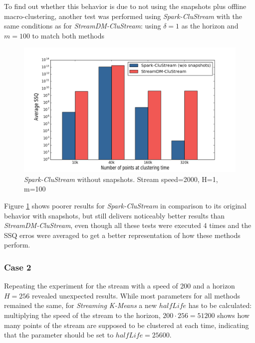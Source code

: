 \documentclass[10pt, conference, compsocconf]{IEEEtran}
\begin{document}
To find out whether this behavior is due to not using the snapshots plus offline macro-clustering, another test was performed using \textit{Spark-CluStream} with the same conditions as for \textit{StreamDM-CluStream}: using $\delta = 1$ as the horizon and $m=100$ to match both methods

\begin{figure}[h]
 \centering
 \includegraphics[scale=0.35]{./styles/comparisonNoSnaps.png}
 \caption{\textit{Spark-CluStream} without snapshots. Stream speed=2000, H=1, m=100}
 \label{fig:comparisonNoSnaps}
\end{figure}

Figure \ref{fig:comparisonNoSnaps} shows poorer results for \textit{Spark-CluStream} in comparison to its original behavior with snapshots, but still delivers noticeably better results than \textit{StreamDM-CluStream}, even though all these tests were executed 4 times and the SSQ erros were averaged to get a better representation of how these methods perform.

\subsubsection{Case 2}

Repeating the experiment for the stream with a speed of 200 and a horizon $H=256$ revealed unexpected results. While most parameters for all methods remained the same, for \textit{Streaming K-Means} a new $halfLife$ has to be calculated: multiplying the speed of the stream to the horizon, $200\cdot 256=51200$ shows how many points of the stream are supposed to be clustered at each time, indicating that the parameter should be set to $halfLife=25600$. 
\end{document}

